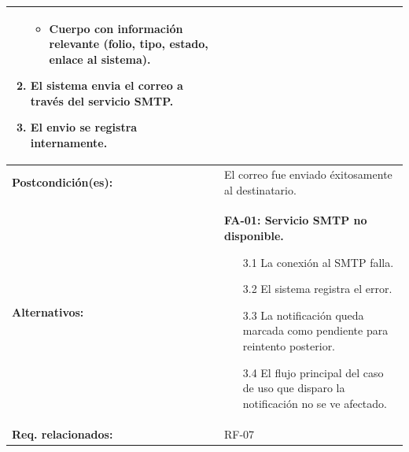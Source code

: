 \begin{longtable}{|L{4cm}|L{9.5cm}|}
\begin{enumerate}[nosep, leftmargin=*]
\begin{itemize}[nosep]
                \item Cuerpo con información relevante (folio, tipo, estado, enlace al sistema).
            \end{itemize}
        \item El sistema envia el correo a través del servicio SMTP.
        \item El envio se registra internamente.
    \end{enumerate} \\
    \hline
    \textbf{Postcondición(es):} & El correo fue enviado éxitosamente al destinatario. \\
    \hline
    \textbf{Alternativos:} &
    \textbf{FA-01: Servicio SMTP no disponible.}
    \begin{enumerate}[nosep, leftmargin=*]
        \item[3.1] La conexión al SMTP falla.
        \item[3.2] El sistema registra el error.
        \item[3.3] La notificación queda marcada como pendiente para reintento posterior.
        \item[3.4] El flujo principal del caso de uso que disparo la notificación no se ve afectado.
    \end{enumerate} \\
    \hline
    \textbf{Req. relacionados:} & RF-07 \\
    \hline
\end{longtable}
